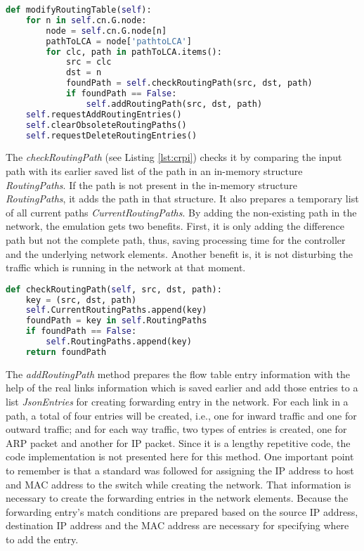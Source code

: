 \begin{lstlisting}[caption={Modify routing table implementation},label={lst:mrti},language=Python,tabsize=2,basicstyle=\footnotesize,breaklines=true, showspaces=false,showstringspaces=false,showtabs=false,frame=single]
def modifyRoutingTable(self):
	for n in self.cn.G.node:
		node = self.cn.G.node[n]
		pathToLCA = node['pathtoLCA']
		for clc, path in pathToLCA.items():
			src = clc
			dst = n
			foundPath = self.checkRoutingPath(src, dst, path)
			if foundPath == False:
				self.addRoutingPath(src, dst, path)
	self.requestAddRoutingEntries()
	self.clearObsoleteRoutingPaths()
	self.requestDeleteRoutingEntries()
\end{lstlisting}
The \textit{checkRoutingPath} (see Listing \ref{lst:crpi}) checks it by comparing the input path with its earlier saved list of the path in an in-memory structure \textit{RoutingPaths}. If the path is not present in the in-memory structure \textit{RoutingPaths}, it adds the path in that structure. It also prepares a temporary list of all current paths \textit{CurrentRoutingPaths}. By adding the non-existing path in the network, the emulation gets two benefits. First, it is only adding the difference path but not the complete path, thus, saving processing time for the controller and the underlying network elements. Another benefit is, it is not disturbing the traffic which is running in the network at that moment.

\begin{lstlisting}[caption={Check routing path implementation},label={lst:crpi},language=Python,tabsize=2,basicstyle=\footnotesize,breaklines=true, showspaces=false,showstringspaces=false,showtabs=false,frame=single]
def checkRoutingPath(self, src, dst, path):
	key = (src, dst, path)
	self.CurrentRoutingPaths.append(key)
	foundPath = key in self.RoutingPaths
	if foundPath == False:
		self.RoutingPaths.append(key)
	return foundPath
\end{lstlisting}

The \textit{addRoutingPath} method prepares the flow table entry information with the help of the real links information which is saved earlier and add those entries to a list \textit{JsonEntries} for creating forwarding entry in the network. For each link in a path, a total of four entries will be created, i.e., one for inward traffic and one for outward traffic; and for each way traffic, two types of entries is created, one for ARP packet and another for IP packet. Since it is a lengthy repetitive code, the code implementation is not presented here for this method. One important point to remember is that a standard was followed for assigning the IP address to host and MAC address to the switch while creating the network. That information is necessary to create the forwarding entries in the network elements. Because the forwarding entry's match conditions are prepared based on the source IP address, destination IP address and the MAC address are necessary for specifying where to add the entry.

